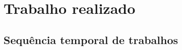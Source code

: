 \chapter{Trabalho realizado} \label{chap:interacoes}

\blindtext

\section{Sequência temporal de trabalhos}\label{sec:trabalhos}

\Blindtext
